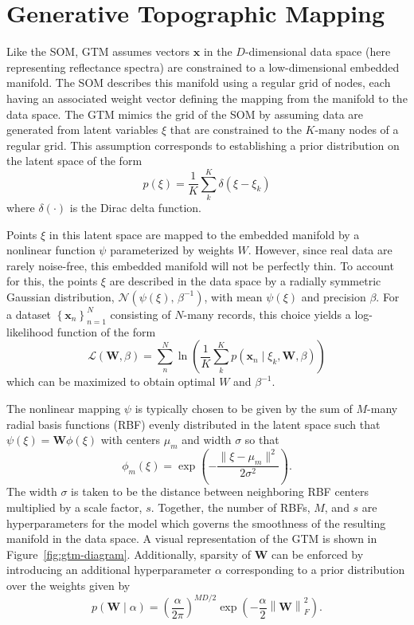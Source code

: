\section{Generative Topographic Mapping}\label{sec:gtm-overview}

Like the  SOM, GTM assumes vectors $\mathbf{x}$ in the $D$-dimensional data
space (here representing reflectance spectra) are constrained to a
low-dimensional embedded manifold. The SOM describes this manifold using a
regular grid of nodes, each having an associated weight vector defining the
mapping from the manifold to the data space. The GTM mimics the grid of the SOM
by assuming data are generated from latent
variables $\xi$ that are constrained to the $K$-many nodes of a regular grid.
This assumption corresponds to establishing a prior distribution on the latent
space of the form
\begin{equation}\label{eq:latent-prob}
    p(\xi) = \frac{1}{K}\sum_k^K \delta(\xi - \xi_k)
\end{equation}
where $\delta(\cdot)$ is the Dirac delta function.

Points $\xi$ in this latent space are mapped to the embedded manifold by a
nonlinear function $\psi$ parameterized by weights $W$. However, since real data
are rarely noise-free, this embedded manifold will not be perfectly thin. To
account for this, the points $\xi$ are described in the data space by a radially
symmetric Gaussian distribution, $\mathcal{N}(\psi(\xi),\, \beta^{-1})$, with
mean $\psi(\xi)$ and precision $\beta$. For a dataset $\left\{
  \mathbf{x}_n\right\}_{n=1}^N$ consisting of $N$-many records, this choice
yields a log-likelihood function of the form
\begin{equation}\label{eq:llh}
    \mathscr{L}(\mathbf{W}, \beta) = \sum_n^N \ln \left(\dfrac{1}{K}\sum_k^K p(\mathbf{x}_n \mid \xi_k, \mathbf{W}, \beta) \right)
\end{equation}
which can be maximized to obtain optimal $W$ and $\beta^{-1}$.

The nonlinear mapping $\psi$ is typically chosen to be given by the sum of
$M$-many radial basis functions (RBF) evenly distributed in the latent space
such that $\psi(\xi) = \mathbf{W}\phi(\xi)$ with centers $\mu_m$ and width $\sigma$ so
that
\begin{equation}
    \phi_m(\xi) = \exp\left(-\dfrac{\lVert \xi - \mu_m \rVert^2}{2\sigma^2}\right).
\end{equation}
The width $\sigma$ is taken to be the distance between neighboring RBF centers
multiplied by a scale factor, $s$. Together, the number of RBFs, $M$, and $s$
are hyperparameters for the model which governs the smoothness of the resulting
manifold in the data space.  A visual representation of the GTM is shown in
Figure~\ref{fig:gtm-diagram}. Additionally, sparsity of $\mathbf{W}$ can be enforced by
introducing an additional hyperparameter $\alpha$ corresponding to a prior
distribution over the weights given by
\begin{equation}\label{eq:weight-prior}
    p(\mathbf{W} \mid \alpha) =  \left( \frac{\alpha}{2\pi} \right)^{MD/2}\exp\left(-\frac{\alpha}{2}\left\lVert \mathbf{W} \right\rVert_{F}^2\right).
\end{equation}

